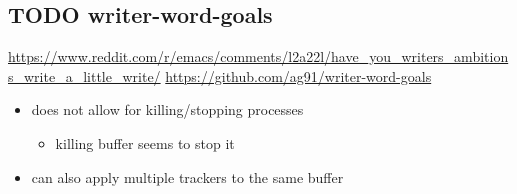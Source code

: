 \documentclass[8pt]{article}
\begin{document}
\subsection{{\bfseries\sffamily TODO} writer-word-goals}
\label{sec:org606309b}
\url{https://www.reddit.com/r/emacs/comments/l2a22l/have\_you\_writers\_ambitions\_write\_a\_little\_write/}
\url{https://github.com/ag91/writer-word-goals}
\begin{itemize}
\item does not allow for killing/stopping processes
\begin{itemize}
\item killing buffer seems to stop it
\end{itemize}
\item can also apply multiple trackers to the same buffer
\end{itemize}
\end{document}
